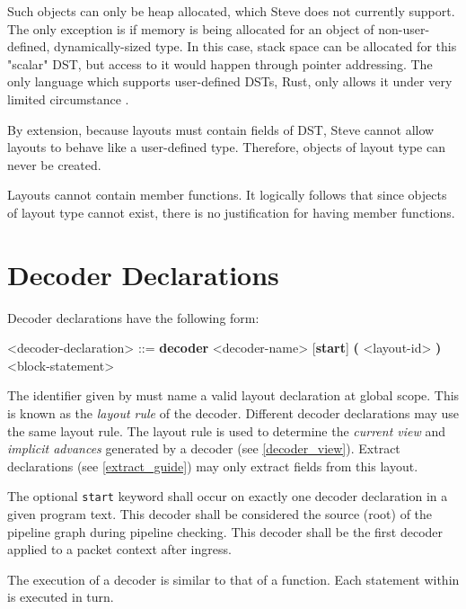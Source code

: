 Such objects can only be heap allocated, which Steve does not currently support. The only exception is if memory is being allocated for an object of non-user-defined, dynamically-sized type. In this case, stack space can be allocated for this "scalar" DST, but access to it would happen through pointer addressing. The only language which supports user-defined DSTs, Rust, only allows it under very limited circumstance \cite{rust_dst_std}.

By extension, because layouts must contain fields of DST, Steve cannot allow layouts to behave like a user-defined type. Therefore, objects of layout type can never be created.
  
Layouts cannot contain member functions. It logically follows that since objects of layout type cannot exist, there is no justification for having member functions.

\section{Decoder Declarations} \label{decoder_guide}

Decoder declarations have the following form:

\begin{minip}
\begin{grammar}
\singlespace
<decoder-declaration> ::=
\textbf{decoder} <decoder-name> [\textbf{start}] 
\textbf{(} <layout-id> \textbf{)}
<block-statement>
\end{grammar}
\end{minip}

The identifier given by  must name a valid layout declaration at global scope. This  is known as the \textit{layout rule} of the decoder. Different decoder declarations may use the same layout rule. The layout rule is used to determine the \textit{current view} and \textit{implicit advances} generated by a decoder (see \ref{decoder_view}). Extract declarations (see \ref{extract_guide}) may only extract fields from this layout.

The optional \texttt{start} keyword shall occur on exactly one decoder declaration in a given program text. This decoder shall be considered the source (root) of the pipeline graph during pipeline checking. This decoder shall be the first decoder applied to a packet context after ingress.

The execution of a decoder is similar to that of a function. Each statement within  is executed in turn. 

